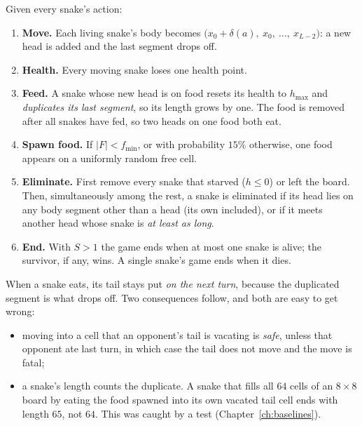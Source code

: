 \begin{algbox}
Given every snake's action:
\begin{enumerate}
\item \textbf{Move.} Each living snake's body becomes $\bigl(x_0 + \delta(a),\ x_0,\ \dots,\ x_{L-2}\bigr)$:
  a new head is added and the last segment drops off.
\item \textbf{Health.} Every moving snake loses one health point.
\item \textbf{Feed.} A snake whose new head is on food resets its health to $h_{\max}$
  and \emph{duplicates its last segment}, so its length grows by one. The food is removed
  after all snakes have fed, so two heads on one food both eat.
\item \textbf{Spawn food.} If $|F| < f_{\min}$, or with probability $15\%$ otherwise, one
  food appears on a uniformly random free cell.
\item \textbf{Eliminate.} First remove every snake that starved ($h\le 0$) or left the
  board. Then, simultaneously among the rest, a snake is eliminated if its head lies on
  any body segment other than a head (its own included), or if it meets another head
  whose snake is \emph{at least as long}.
\item \textbf{End.} With $S>1$ the game ends when at most one snake is alive; the
  survivor, if any, wins. A single snake's game ends when it dies.
\end{enumerate}
\end{algbox}

\begin{warnbox}
When a snake eats, its tail stays put \emph{on the next turn}, because the duplicated
segment is what drops off. Two consequences follow, and both are easy to get wrong:
\begin{itemize}
\item moving into a cell that an opponent's tail is vacating is \emph{safe}, unless that
  opponent ate last turn, in which case the tail does not move and the move is fatal;
\item a snake's length counts the duplicate. A snake that fills all $64$ cells of an
  $8\times8$ board by eating the food spawned into its own vacated tail cell ends with
  length $65$, not $64$. This was caught by a test (Chapter~\ref{ch:baselines}).
\end{itemize}
\end{warnbox}

